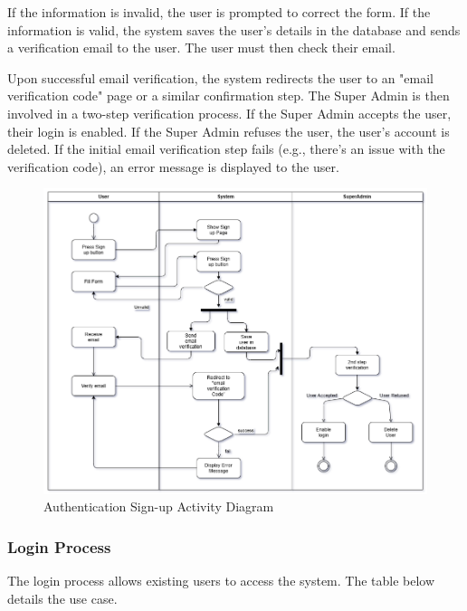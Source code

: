 If the information is invalid, the user is prompted to correct the form. If the information is valid, the system saves the user's details in the database and sends a verification email to the user. The user must then check their email. 

Upon successful email verification, the system redirects the user to an "email verification code" page or a similar confirmation step. The Super Admin is then involved in a two-step verification process. If the Super Admin accepts the user, their login is enabled. If the Super Admin refuses the user, the user's account is deleted. If the initial email verification step fails (e.g., there's an issue with the verification code), an error message is displayed to the user.

\newpage

\begin{figure}[ht!]
    \centering
    \includegraphics[width=1\textwidth]{images/signup_activitydiag.png}
    \caption{Authentication Sign-up Activity Diagram}
    \label{fig:signup-activity-diagram}
\end{figure}



\subsubsection{Login Process}
The login process allows existing users to access the system. The table below details the use case.

